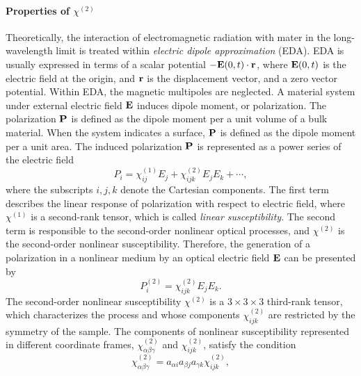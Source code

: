 \paragraph{Properties of $\chi^{(2)}$}\label{chi_properties}
Theoretically, the interaction of electromagnetic radiation with mater in the long-wavelength limit is treated within \emph{electric dipole approximation} (EDA). 
EDA is usually expressed in terms of a scalar potential $-{\bf E}(0,t)\cdot {\bf r}$, where ${\bf E}(0,t)$ is the electric field at the origin, and $\bf r$ is the displacement vector, and a zero vector potential\cite{Kobe1982}. 
Within EDA, the magnetic multipoles are neglected.
A material system under external electric field $\bf E$ induces dipole moment, or
polarization. The polarization $\bf P$ is defined as the dipole moment per
a unit volume of a bulk material. 
When the system indicates a surface, $\bf P$ is defined as the dipole moment per a unit area. 
The induced polarization $\bf P$ is represented as a power series of the electric field\cite{Morita2018}
\begin{equation}
{P}_{i} =\chi^{(1)}_{ij}E_j + \chi^{(2)}_{ijk}E_{j}E_{k} + \cdots,
\label{eq:polarization_1}
\end{equation}
where the subscripts $i,j,k$ denote the Cartesian components. 
The first term describes the linear response of polarization with respect 
to electric field, where $\chi^{(1)}$ is a second-rank tensor, which is called \emph{linear susceptibility}. 
The second term is responsible to the second-order nonlinear optical processes, and $\chi^{(2)}$ is the second-order nonlinear susceptibility.
Therefore, the generation of a polarization in a nonlinear medium by an optical electric field ${\bf E}$ can be presented by
\begin{equation}
{P}^{(2)}_{i} =\chi^{(2)}_{ijk}E_{j}E_{k}.
\label{eq:polarization_1}
\end{equation}
The second-order nonlinear susceptibility $\chi^{(2)}$ is a $3 \times 3 \times 3$ third-rank tensor, which characterizes the process and whose components $\chi^{(2)}_{ijk}$ are 
restricted by the symmetry of the sample.
The components of nonlinear susceptibility represented in different coordinate frames, $\chi^{(2)}_{\alpha\beta\gamma}$ and $\chi^{(2)}_{ijk}$, satisfy the condition 
\begin{equation}
\chi^{(2)}_{\alpha\beta\gamma} = a_{\alpha i}a_{\beta j}a_{\gamma k}\chi^{(2)}_{ijk},
\label{eq:tensor_chi}
\end{equation}
